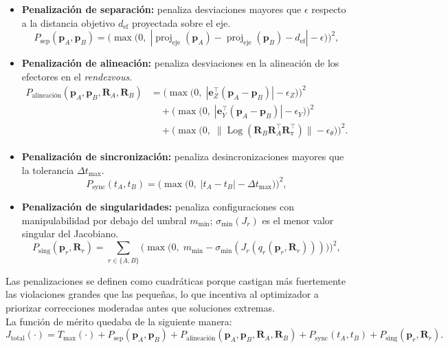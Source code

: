 \begin{itemize}
  \item \textbf{Penalización de separación:} penaliza desviaciones mayores que \(\epsilon\)
  respecto a la distancia objetivo \(d_{\text{ef}}\) proyectada sobre el eje.
\[
  P_{\text{sep}}(\mathbf{p}_A,\mathbf{p}_B)
  =\Big(\max\big(0,\;|\operatorname{proj}_{\text{eje}}(\mathbf{p}_A)-\operatorname{proj}_{\text{eje}}(\mathbf{p}_B)-d_{\text{ef}}|- \epsilon\big)\Big)^2,
  \]

  \item \textbf{Penalización de alineación:} penaliza desviaciones en la alineación de 
  los efectores en el \textit{rendezvous}.
\[
\begin{aligned}
P_{\text{alineación}}(\mathbf{p}_A,\mathbf{p}_B,\mathbf{R}_A,\mathbf{R}_B)
&= \big(\max\big(0,\;|\mathbf{e}_Z^\top(\mathbf{p}_A-\mathbf{p}_B)|-\epsilon_Z\big)\big)^2 \\
&\quad + \big(\max\big(0,\;|\mathbf{e}_Y^\top(\mathbf{p}_A-\mathbf{p}_B)|-\epsilon_Y\big)\big)^2 \\
&\quad + \big(\max\big(0,\;\|\operatorname{Log}(\mathbf{R}_B\mathbf{R}_A^\top\mathbf{R}_{\pi}^\top)\|-\epsilon_{\theta}\big)\big)^2.
\end{aligned}
\]

  \item \textbf{Penalización de sincronización:} penaliza desincronizaciones mayores que la tolerancia \(\Delta t_{\max}\).
\[
  P_{\text{sync}}(t_A,t_B)
  =\Big(\max\big(0,\;|t_A-t_B|-\Delta t_{\max}\big)\Big)^2,
  \]
  

  \item \textbf{Penalización de singularidades:} penaliza configuraciones con manipulabilidad por debajo del umbral \(m_{\min}\); \(\sigma_{\min}(J_r)\) es el menor valor singular del Jacobiano.
\[
  P_{\text{sing}}(\mathbf{p}_r,\mathbf{R}_r)
  =\sum_{r\in\{A,B\}} \Big(\max\big(0,\;m_{\min}-\sigma_{\min}(J_r(q_r(\mathbf{p}_r,\mathbf{R}_r)))\big)\Big)^2,
  \]

\end{itemize}
Las penalizaciones se definen como cuadráticas porque castigan más fuertemente 
las violaciones grandes que las pequeñas, lo que incentiva al optimizador a priorizar
correcciones moderadas antes que soluciones extremas. \\

La función de mérito quedaba de la siguiente manera:
\[
  J_{\text{total}}(\cdot)
  = T_{\max}(\cdot)
  + P_{\text{sep}}(\mathbf{p}_A,\mathbf{p}_B)
  + P_{\text{alineación}}(\mathbf{p}_A,\mathbf{p}_B,\mathbf{R}_A,\mathbf{R}_B)
  + P_{\text{sync}}(t_A,t_B)
  + P_{\text{sing}}(\mathbf{p}_r,\mathbf{R}_r).
\]

